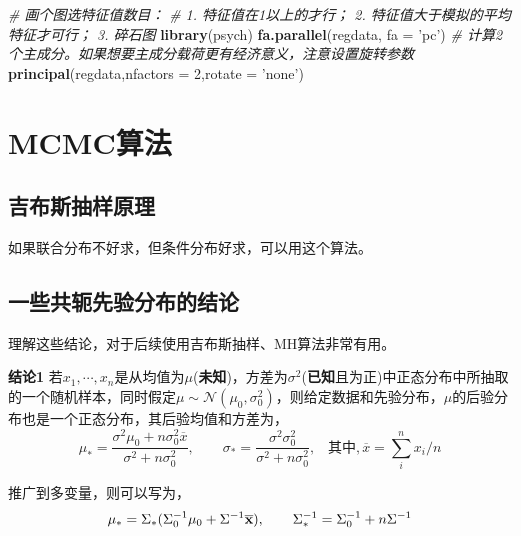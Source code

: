 \documentclass[
]{book}
\newenvironment{Shaded}{\begin{snugshade}}{\end{snugshade}}
\newcommand{\CommentTok}[1]{\textcolor[rgb]{0.56,0.35,0.01}{\textit{#1}}}
\newcommand{\DataTypeTok}[1]{\textcolor[rgb]{0.13,0.29,0.53}{#1}}
\newcommand{\DecValTok}[1]{\textcolor[rgb]{0.00,0.00,0.81}{#1}}
\newcommand{\KeywordTok}[1]{\textcolor[rgb]{0.13,0.29,0.53}{\textbf{#1}}}
\newcommand{\NormalTok}[1]{#1}
\newcommand{\StringTok}[1]{\textcolor[rgb]{0.31,0.60,0.02}{#1}}
\begin{document}
\begin{Shaded}
\begin{Highlighting}[]
\CommentTok{# 画个图选特征值数目：}
\CommentTok{# 1. 特征值在1以上的才行； 2. 特征值大于模拟的平均特征才可行； 3. 碎石图}
\KeywordTok{library}\NormalTok{(psych)}
\KeywordTok{fa.parallel}\NormalTok{(regdata, }\DataTypeTok{fa =} \StringTok{'pc'}\NormalTok{)}
\CommentTok{# 计算2个主成分。如果想要主成分载荷更有经济意义，注意设置旋转参数}
 \KeywordTok{principal}\NormalTok{(regdata,}\DataTypeTok{nfactors =} \DecValTok{2}\NormalTok{,}\DataTypeTok{rotate =} \StringTok{'none'}\NormalTok{)}
\end{Highlighting}
\end{Shaded}

\hypertarget{mcmcux7b97ux6cd5}{%
\section{MCMC算法}\label{mcmcux7b97ux6cd5}}

\hypertarget{ux5409ux5e03ux65afux62bdux6837ux539fux7406}{%
\subsection{吉布斯抽样原理}\label{ux5409ux5e03ux65afux62bdux6837ux539fux7406}}

如果联合分布不好求，但条件分布好求，可以用这个算法。

\hypertarget{ux4e00ux4e9bux5171ux8f6dux5148ux9a8cux5206ux5e03ux7684ux7ed3ux8bba}{%
\subsection{一些共轭先验分布的结论}\label{ux4e00ux4e9bux5171ux8f6dux5148ux9a8cux5206ux5e03ux7684ux7ed3ux8bba}}

理解这些结论，对于后续使用吉布斯抽样、MH算法非常有用。

\textbf{结论1} 若\(x_1,\cdots,x_n\)是从均值为\(\mu\)(\textbf{未知})，方差为\(\sigma^2\)(\textbf{已知}且为正)中正态分布中所抽取的一个随机样本，同时假定\(\mu\sim \mathcal{N}(\mu_0,\sigma_0^2)\)，则给定数据和先验分布，\(\mu\)的后验分布也是一个正态分布，其后验均值和方差为，
\[\mu_* = \frac{\sigma^2\mu_0+n\sigma_0^2\overline x}{\sigma^2+n\sigma_0^2},\hspace{2em}\sigma_*=\frac{\sigma^2\sigma^2_0}{\sigma^2+n\sigma^2_0},\;\;\;\text{其中},\overline x= \sum_i^n x_i/n\]

推广到多变量，则可以写为，
\[{\mu}_*=\Sigma_*(\Sigma_0^{-1}{\mu}_0+\Sigma^{-1}\overline{\bf{x}}), \hspace{2em}\Sigma_*^{-1} = \Sigma_0^{-1}+n\Sigma^{-1}\]
\end{document}
